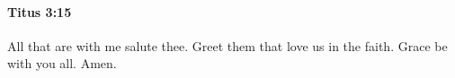 		\paragraph{Titus 3:15} %
			\label{TITUS-3-15}

			All that are with me salute thee.  Greet them that love us in the faith.  Grace be with you all. Amen.

			\begin{framed}
			\scriptsize
				\begin{compactdesc}
					\item[SBLG] 
				\end{compactdesc}
			\end{framed}